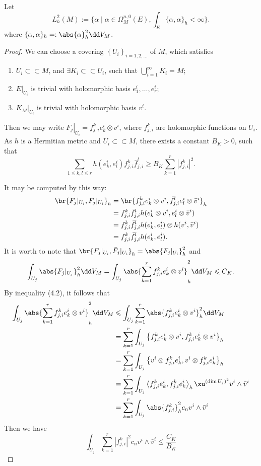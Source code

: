 Let 
\[
  L^2_h(M):=\biggl\{\alpha\mid \alpha\in \Omega^{n,0}_M(E),\int_E \{\alpha,\alpha\}_h<\infty\biggr\}.
\]
where $\{\alpha,\alpha\}_h=:\abs{\alpha}_h^2 \dd V_M$.
\begin{proof}
  We can choose a covering $\left\{U_i\right\}_{i=1,2, \ldots}$ of $M$, which satisfies
  \begin{enumerate}[label=(\arabic*)]
    \item $U_i \subset \subset M$, and $\exists K_i \subset \subset U_i$, such that $\bigcup_{i=1}^{\infty} K_i=M$;
    \item $\left.E\right|_{U_i}$ is trivial with holomorphic basis $e_1^i, \ldots, e_r^i$;
    \item $\left.K_M\right|_{U_i}$ is trivial with holomorphic basis $v^i$.
  \end{enumerate}

Then we may write $\left.F_j\right|_{U_i}=f_{j, i}^k e_k^i \otimes v^i$, where $f_{j, i}^k$ are holomorphic functions on $U_i$. As $h$ is a Hermitian metric and $U_i \subset \subset M$, there exists a constant $B_K>0$, such that
$$
\sum_{1 \leq k, l \leq r} h\left(e_k^i, e_l^i\right) f_{j, i}^k \bar{f}_{j, i}^l \geq B_K \sum_{k=1}^r\left|f_{j, i}^k\right|^2 .
$$

It may be computed by this way:
\begin{align*}
  \br{F_j|_{U_i},\bar{F}_j|_{U_i}}_h &= \br{f_{j, i}^k e_k^i \otimes v^i,\bar{f}_{j, i}^l e_l^i \otimes \bar{v}^i}_h\\ 
  &=f_{j, i}^k\bar{f}_{j, i}^l  h(e_k^i \otimes v^i, e_l^i \otimes \bar{v}^i)\\ 
  &=f_{j, i}^k\bar{f}_{j, i}^l  h(e_k^i , e_l^i )\otimes h(v^i,\bar{v}^i)\\ 
  &=f_{j, i}^k\bar{f}_{j, i}^l  h(e_k^i , e_l^i ).
\end{align*}
  It is worth to note that $\br{F_j|_{U_i},\bar{F}_j|_{U_i}}_h=\abs{F_j|_{U_i}}^2_h$ and \[
    \int_{U_j} \abs{F_{j}|_{U_j}}_h^2 \dd V_M =\int_{U_j} \abs{\sum_{k=1}^r f_{j,i}^k e_k^i \otimes v^i}_h^2 \dd V_M \leqslant C_K.  \]
By inequality (4.2), it follows that
\begin{align*}
  \int_{U_j} \abs{\sum_{k=1}^r f_{j,i}^k e_k^i \otimes v^i}_h^2 \dd V_M &\leqslant\int_{U_j} \sum_{k=1}^r \abs{f_{j,i}^k e_k^i \otimes v^i}_h^2 \dd V_M \\
  &=\sum_{k=1}^r\int_{U_j} \left\{f_{j,i}^k e_k^i \otimes v^i,f_{j,i}^k e_k^i \otimes v^i\right\}_h\\ 
  &=\sum_{k=1}^r\int_{U_j} \left\{ v^i \otimes f_{j,i}^k e_k^i,v^i \otimes f_{j,i}^k e_k^i\right\}_h\\
&=\sum_{k=1}^r\int_{U_j} \left\langle f_{j,i}^k e_k^i,f_{j,i}^k e_k^i\right\rangle_h \xu^{(\dim U_j)^2} v^i\wedge \bar{v}^i\\ 
&=\sum_{k=1}^r\int_{U_j} \abs{f_{j,i}^k}^2_h c_n v^i\wedge \bar{v}^i
\end{align*}
  Then we have
\begin{equation}
  \label{eq:eq4.3}
  \int_{U_j} \sum_{k=1}^r\left|f_{j, i}^k\right|^2 c_n v^i \wedge \bar{v}^i \leq \frac{C_K}{B_K}
\end{equation}
  

\end{proof}
